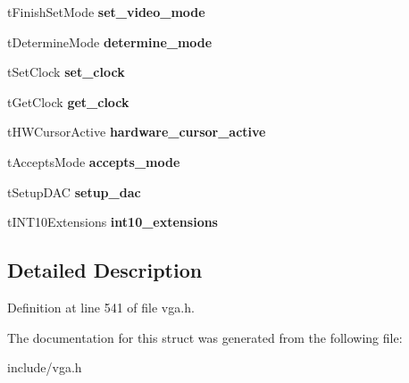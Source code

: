 \begin{DoxyCompactItemize}
\item 
\hypertarget{structSVGA__Driver_afad168056782b84b2eec03c3e0b6f132}{t\-Finish\-Set\-Mode {\bfseries set\-\_\-video\-\_\-mode}}\label{structSVGA__Driver_afad168056782b84b2eec03c3e0b6f132}

\item 
\hypertarget{structSVGA__Driver_a2d72eb682afc752821c0f1ec4e3d0ce3}{t\-Determine\-Mode {\bfseries determine\-\_\-mode}}\label{structSVGA__Driver_a2d72eb682afc752821c0f1ec4e3d0ce3}

\item 
\hypertarget{structSVGA__Driver_a59225904a80dbe9f92d9ba2ee227e1f8}{t\-Set\-Clock {\bfseries set\-\_\-clock}}\label{structSVGA__Driver_a59225904a80dbe9f92d9ba2ee227e1f8}

\item 
\hypertarget{structSVGA__Driver_a209ef280bb27f00d2226050998cd5cb0}{t\-Get\-Clock {\bfseries get\-\_\-clock}}\label{structSVGA__Driver_a209ef280bb27f00d2226050998cd5cb0}

\item 
\hypertarget{structSVGA__Driver_a3936aa6067ba314fe1aa38fbc89933cd}{t\-H\-W\-Cursor\-Active {\bfseries hardware\-\_\-cursor\-\_\-active}}\label{structSVGA__Driver_a3936aa6067ba314fe1aa38fbc89933cd}

\item 
\hypertarget{structSVGA__Driver_a80ae597edcf43eeb150550b23752729c}{t\-Accepts\-Mode {\bfseries accepts\-\_\-mode}}\label{structSVGA__Driver_a80ae597edcf43eeb150550b23752729c}

\item 
\hypertarget{structSVGA__Driver_a5968c7cd8b28c97aea5860fbe6433e02}{t\-Setup\-D\-A\-C {\bfseries setup\-\_\-dac}}\label{structSVGA__Driver_a5968c7cd8b28c97aea5860fbe6433e02}

\item 
\hypertarget{structSVGA__Driver_aff7ace887c47e1f700375eb6324b1d91}{t\-I\-N\-T10\-Extensions {\bfseries int10\-\_\-extensions}}\label{structSVGA__Driver_aff7ace887c47e1f700375eb6324b1d91}

\end{DoxyCompactItemize}


\subsection{Detailed Description}


Definition at line 541 of file vga.\-h.



The documentation for this struct was generated from the following file\-:\begin{DoxyCompactItemize}
\item 
include/vga.\-h\end{DoxyCompactItemize}
